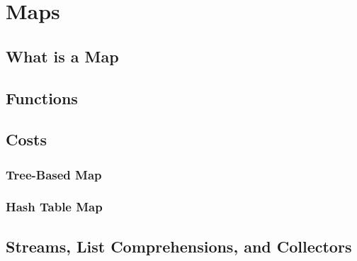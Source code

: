 \chapter{Maps}
\label{chap:maps}


\section{What is a Map}


\section{Functions}

\section{Costs}

\subsection{Tree-Based Map}

\subsection{Hash Table Map}

\section{Streams, List Comprehensions, and Collectors}
